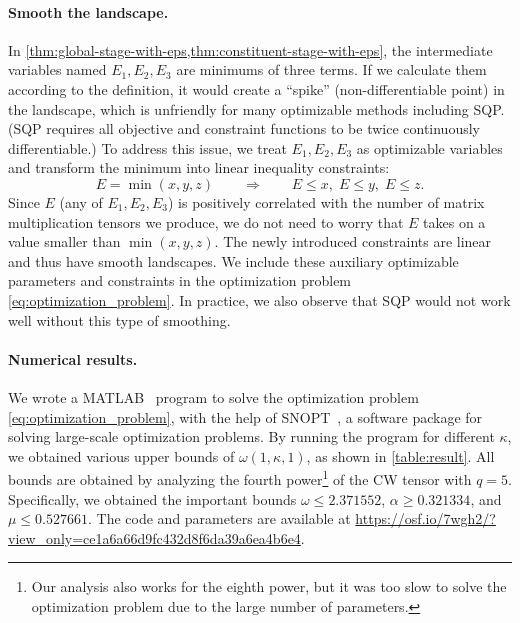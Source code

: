 \paragraph{Smooth the landscape.} In \cref{thm:global-stage-with-eps,thm:constituent-stage-with-eps}, the intermediate variables named $E_1, E_2, E_3$ are minimums of three terms. If we calculate them according to the definition, it would create a ``spike'' (non-differentiable point) in the landscape, which is unfriendly for many optimizable methods including SQP. (SQP requires all objective and constraint functions to be twice continuously differentiable.) To address this issue, we treat $E_1, E_2, E_3$ as optimizable variables and transform the minimum into linear inequality constraints:
\[
  E = \min(x, y, z) \qquad \Rightarrow \qquad E \le x, \; E \le y, \; E \le z.
\]
Since $E$ (any of $E_1, E_2, E_3$) is positively correlated with the number of matrix multiplication tensors we produce, we do not need to worry that $E$ takes on a value smaller than $\min(x, y, z)$. The newly introduced constraints are linear and thus have smooth landscapes. We include these auxiliary optimizable parameters and constraints in the optimization problem \eqref{eq:optimization_problem}. In practice, we also observe that SQP would not work well without this type of smoothing.

\paragraph{Numerical results.}
\label{subsec:numerical}

We wrote a MATLAB~\cite{MATLAB2022} program to solve the optimization problem \eqref{eq:optimization_problem}, with the help of SNOPT~\cite{SNOPT}, a software package for solving large-scale optimization problems. By running the program for different $\kappa$, we obtained various upper bounds of $\omega(1, \kappa, 1)$, as shown in \cref{table:result}. All bounds are obtained by analyzing the fourth power\footnote{Our analysis also works for the eighth power, but it was too slow to solve the optimization problem due to the large number of parameters.} of the CW tensor with $q = 5$. Specifically, we obtained the important bounds $\omega \le 2.371552$, $\alpha \ge 0.321334$, and $\mu \le 0.527661$. The code and parameters are available at \url{https://osf.io/7wgh2/?view_only=ce1a6a66d9fc432d8f6da39a6ea4b6e4}.

